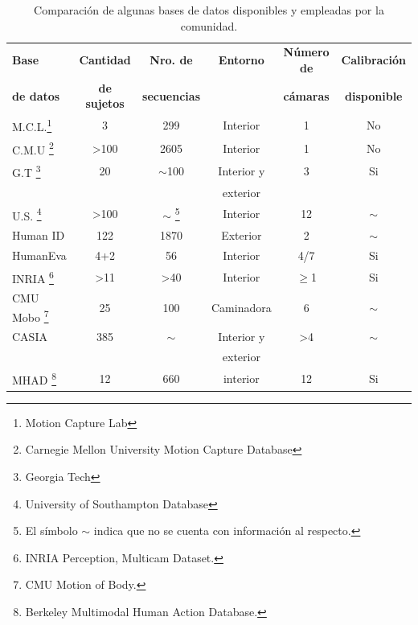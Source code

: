 \begin{table}[h!]
	\centering	
	\caption{Comparación de algunas bases de datos disponibles y empleadas por la comunidad.}
	\label{bases_relevadas}
	\begin{minipage}{\textwidth} %
	\begin{tabular}{||l|ccccc||} 
\hline
\rowcolor[HTML]{CBCEFB} 

\textbf{Base}     & \textbf{Cantidad }  & \textbf{Nro. de }   & \textbf{Entorno} & \textbf{Número de} & \textbf{Calibración}\\
\rowcolor[HTML]{CBCEFB} 
\textbf{de datos} & \textbf{de sujetos} & \textbf{secuencias} &         & \textbf{cámaras }  &  \textbf{disponible} \\


\hline \hline
M.C.L.\footnote{Motion Capture Lab}  & 3 		& 		299	   & Interior&     1    &    No      \\ \hline
C.M.U  \footnote{Carnegie Mellon University Motion Capture Database}	
 & >100     &       2605   & Interior&      1   &    No       \\ \hline
G.T \footnote{Georgia Tech} &       20    & $\sim$100           & Interior y &   3      &  Si       \\ 
	 &		 &					 & exterior        &         &    \\ \hline
U.S. \footnote{University of Southampton Database} &       >100    &     $\sim$ \footnote{El símbolo $\sim$ indica que no se cuenta con información al respecto.}  & Interior &   12      &  $\sim$      \\ \hline
Human ID  &     122    & 1870           & Exterior &   2      &$\sim$       \\ \hline
HumanEva &     4+2    & 56           & Interior &   4/7      &  Si       \\ \hline
INRIA \footnote{INRIA Perception, Multicam Dataset. } &       >11    & >40           & Interior &   $\geq$1      &  Si       \\ \hline
CMU Mobo \footnote{CMU Motion of Body.} &     25    & 100           & Caminadora &   6      &  $\sim$       \\ \hline
CASIA &     385    & $\sim$           & Interior y  &   >4      &  $\sim$       \\ 
&         &            & exterior  &         &      \\ \hline
MHAD \footnote{Berkeley Multimodal Human Action Database.} & 12         & 660            & interior  & 12        & Si      \\ 
\hline \hline



\end{tabular}
\end{minipage}
\end{table}
